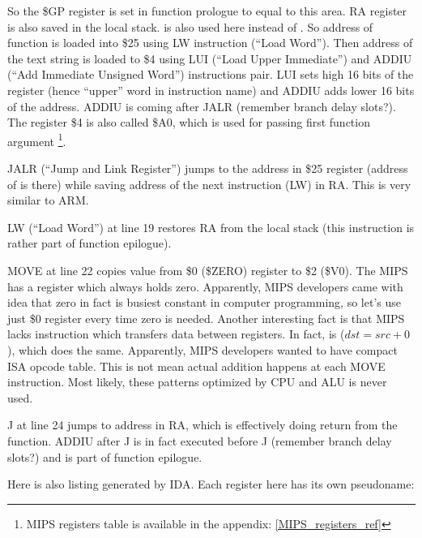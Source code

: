 So the \$GP register is set in function prologue to equal to this area.
\ac{RA} register is also saved in the local stack.
\puts is also used here instead of \printf.
So address of \puts function is loaded into \$25 using LW instruction (``Load Word'').
Then address of the text string is loaded to \$4 using LUI (``Load Upper Immediate'') and 
ADDIU (``Add Immediate Unsigned Word'') instructions pair.
LUI sets high 16 bits of the register (hence ``upper'' word in instruction name) and ADDIU adds
lower 16 bits of the address.
ADDIU is coming after JALR (remember branch delay slots?).
The register \$4 is also called \$A0, which is used for passing first function argument
\footnote{MIPS registers table is available in the appendix: \ref{MIPS_registers_ref}}.

JALR (``Jump and Link Register'') jumps to the address in \$25 register (address of \puts is there) while saving
address of the next instruction (LW) in \ac{RA}.
This is very similar to ARM.

LW (``Load Word'') at line 19 restores \ac{RA} from the local stack 
(this instruction is rather part of function epilogue).

MOVE at line 22 copies value from \$0 (\$ZERO) register to \$2 (\$V0). 
The MIPS has a  register which always holds zero.
Apparently, MIPS developers came with idea that zero in fact is busiest constant in computer programming,
so let's use just \$0 register every time zero is needed.
Another interesting fact is that MIPS lacks instruction which transfers data between registers.
In fact,  is  ($dst=src+0$), which does the same.
Apparently, MIPS developers wanted to have compact \ac{ISA} opcode table.
This is not mean actual addition happens at each MOVE instruction. 
Most likely, these patterns optimized by \ac{CPU} and \ac{ALU} is never used.

J at line 24 jumps to address in \ac{RA}, which is effectively doing return from the function.
ADDIU after J is in fact executed before J (remember branch delay slots?) and is part of function epilogue.

Here is also listing generated by IDA. Each register here has its own pseudoname:



